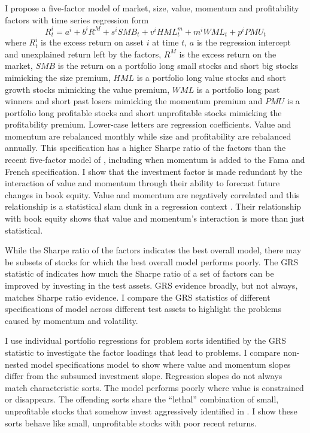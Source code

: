I propose a five-factor model of market, size, value, momentum and
profitability factors with time series regression form
\begin{equation} \label{eq:B16}
R_t^i = a^i+b^iR^M+s^iSMB_t+v^iHML_t^m+m^iWML_t+p^iPMU_t 
\end{equation}
where $R_t^i$ is the excess return on asset $i$ at time $t$,
$a$ is the regression intercept and unexplained return left by the factors,
$R^M$ is the excess return on the market,
$SMB$ is the return on a portfolio long small stocks and short big stocks
mimicking the size premium,
$HML$ is a portfolio long value stocks and short growth stocks mimicking the
value premium,
$WML$ is a portfolio long past winners and short past losers mimicking the
momentum premium and
$PMU$ is a portfolio long profitable stocks and short unprofitable stocks
mimicking the profitability premium.
Lower-case letters are regression coefficients.
Value and momentum are rebalanced monthly while size and profitability are
rebalanced annually.
This specification has a higher Sharpe ratio of the factors
than the recent five-factor model of \textcite{fama2015five}, including when
momentum is added to the Fama and French specification.
I show that the investment factor is made redundant by
the interaction of value and momentum through their ability to forecast
future changes in book equity.
Value and momentum are negatively correlated and this relationship is a
statistical slam dunk in a regression context 
\parencite{asness1997interaction, fama2015incremental}.
Their relationship with book equity shows that value and
momentum's interaction is more than just statistical.

While the Sharpe ratio of the factors indicates the best overall model,
there may be subsets of stocks for which the best overall model
performs poorly.
The GRS statistic of \textcite{gibbons1989test} indicates how much the Sharpe
ratio of a set of factors can be improved by investing in the test assets.
GRS evidence broadly, but not always, matches Sharpe ratio evidence.
I compare the GRS statistics of different specifications of model across
different test assets to highlight the problems caused by momentum and
volatility.

I use individual portfolio regressions for problem sorts identified by the GRS
statistic to investigate the factor loadings that lead to problems. I compare
non-nested model specifications model to show where value and momentum slopes
differ from the subsumed investment slope. Regression slopes do not always
match characteristic sorts. The model performs poorly where value is
constrained or disappears. The offending sorts share the ``lethal” combination
of small, unprofitable stocks that somehow invest aggressively identified in
\textcite{fama2015five, fama2016dissecting}. I show these sorts behave like
small, unprofitable stocks with poor recent returns.
